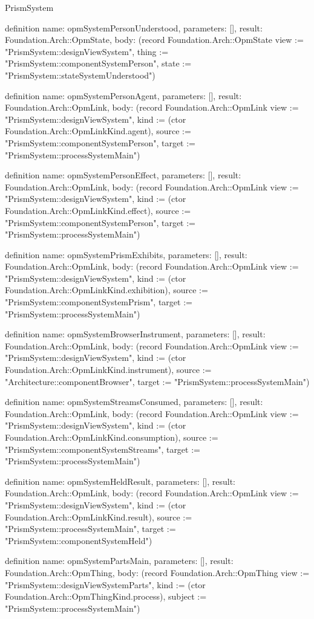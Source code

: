 \begin{lexlean}{PrismSystem}
\begin{semanticmodule}
definition{
  name: opmSystemPersonUnderstood,
  parameters: [],
  result: Foundation.Arch::OpmState,
  body: (record Foundation.Arch::OpmState {view := "PrismSystem::designViewSystem", thing := "PrismSystem::componentSystemPerson", state := "PrismSystem::stateSystemUnderstood"})
}

definition{
  name: opmSystemPersonAgent,
  parameters: [],
  result: Foundation.Arch::OpmLink,
  body: (record Foundation.Arch::OpmLink {view := "PrismSystem::designViewSystem", kind := (ctor Foundation.Arch::OpmLinkKind.agent), source := "PrismSystem::componentSystemPerson", target := "PrismSystem::processSystemMain"})
}

definition{
  name: opmSystemPersonEffect,
  parameters: [],
  result: Foundation.Arch::OpmLink,
  body: (record Foundation.Arch::OpmLink {view := "PrismSystem::designViewSystem", kind := (ctor Foundation.Arch::OpmLinkKind.effect), source := "PrismSystem::componentSystemPerson", target := "PrismSystem::processSystemMain"})
}

definition{
  name: opmSystemPrismExhibits,
  parameters: [],
  result: Foundation.Arch::OpmLink,
  body: (record Foundation.Arch::OpmLink {view := "PrismSystem::designViewSystem", kind := (ctor Foundation.Arch::OpmLinkKind.exhibition), source := "PrismSystem::componentSystemPrism", target := "PrismSystem::processSystemMain"})
}

definition{
  name: opmSystemBrowserInstrument,
  parameters: [],
  result: Foundation.Arch::OpmLink,
  body: (record Foundation.Arch::OpmLink {view := "PrismSystem::designViewSystem", kind := (ctor Foundation.Arch::OpmLinkKind.instrument), source := "Architecture::componentBrowser", target := "PrismSystem::processSystemMain"})
}

definition{
  name: opmSystemStreamsConsumed,
  parameters: [],
  result: Foundation.Arch::OpmLink,
  body: (record Foundation.Arch::OpmLink {view := "PrismSystem::designViewSystem", kind := (ctor Foundation.Arch::OpmLinkKind.consumption), source := "PrismSystem::componentSystemStreams", target := "PrismSystem::processSystemMain"})
}

definition{
  name: opmSystemHeldResult,
  parameters: [],
  result: Foundation.Arch::OpmLink,
  body: (record Foundation.Arch::OpmLink {view := "PrismSystem::designViewSystem", kind := (ctor Foundation.Arch::OpmLinkKind.result), source := "PrismSystem::processSystemMain", target := "PrismSystem::componentSystemHeld"})
}

definition{
  name: opmSystemPartsMain,
  parameters: [],
  result: Foundation.Arch::OpmThing,
  body: (record Foundation.Arch::OpmThing {view := "PrismSystem::designViewSystemParts", kind := (ctor Foundation.Arch::OpmThingKind.process), subject := "PrismSystem::processSystemMain"})
}


\end{semanticmodule}
\end{lexlean}
